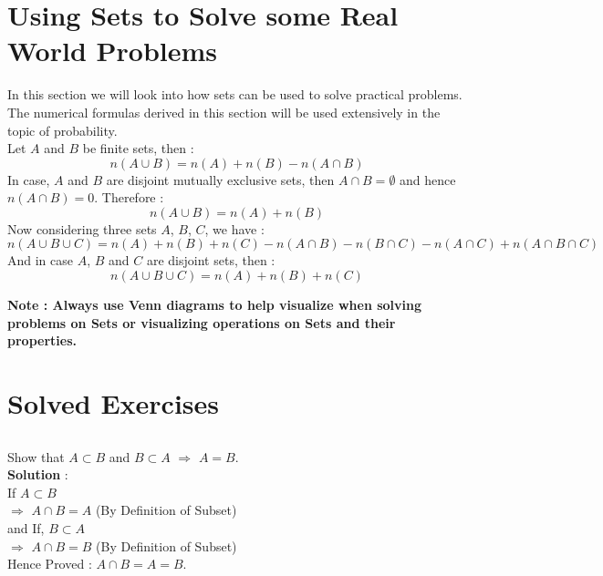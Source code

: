 \documentclass[12pt, letterpaper]{article}
\begin{document}
\section{Using Sets to Solve some Real World Problems}
In this section we will look into how sets can be used to solve practical problems. The numerical formulas derived in this section will be used extensively in the topic of probability.\\
Let $A$ and $B$ be finite sets, then :
\begin{equation}
    n(A \cup B) = n(A) + n(B) - n(A \cap B)
\end{equation}
In case, $A$ and $B$ are disjoint mutually exclusive sets, then $A \cap B = \emptyset$ and hence $n(A \cap B) = 0$. Therefore : 
\begin{equation}
    n(A \cup B) = n(A) + n(B)
\end{equation}
Now considering three sets $A$, $B$, $C$, we have : 
\begin{equation}
    n(A \cup B \cup C) = n(A) + n(B) + n(C) - n(A \cap B) - n(B \cap C) - n(A \cap C) + n(A \cap B \cap C)
\end{equation}
And in case $A$, $B$ and $C$ are disjoint sets, then : 
\begin{equation}
    n(A \cup B \cup C) = n(A) + n(B) + n(C)
\end{equation}
\begin{displayquote}
\textbf{Note : Always use Venn diagrams to help visualize when solving problems on Sets or visualizing operations on Sets and their properties.}
\end{displayquote}

\section{Solved Exercises}

\subsection{}
Show that $A \subset B$ and $B \subset A$ $\Rightarrow$ $A = B$.\\
\textbf{Solution} : \\
If $A \subset B$\\
$\Rightarrow$ $A \cap B = A$ (By Definition of Subset) \\
and If, $B \subset A$ \\
$\Rightarrow$ $A \cap B = B$ (By Definition of Subset) \\
Hence Proved : $A \cap B = A = B$.
\end{document}
